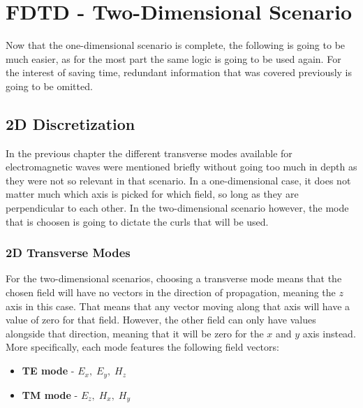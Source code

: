 
\chapter{FDTD - Two-Dimensional Scenario} %

\label{Chapter3} %


Now that the one-dimensional scenario is complete, the following is going to be much easier, as for the most part the same logic is going to be used again. For the interest of saving time, redundant information that was covered previously is going to be omitted.

\section{2D Discretization}

In the previous chapter the different transverse modes available for electromagnetic waves were mentioned briefly without going too much in depth as they were not so relevant in that scenario. In a one-dimensional case, it does not matter much which axis is picked for which field, so long as they are perpendicular to each other. In the two-dimensional scenario however, the mode that is choosen is going to dictate the curls that will be used. 

\subsection{2D Transverse Modes}

For the two-dimensional scenarios, choosing a transverse mode means that the chosen field will have no vectors in the direction of propagation, meaning the $z$ axis in this case. That means that any vector moving along that axis will have a value of zero for that field. However, the other field can only have values alongside that direction, meaning that it will be zero for the $x$ and $y$ axis instead. More specifically, each mode features the following field vectors:

\begin{itemize}
	\item \textbf{TE mode} - \space $E_x,\; E_y,\; H_z$
	\item \textbf{TM mode} - \space $E_z,\; H_x,\; H_y$
\end{itemize}

